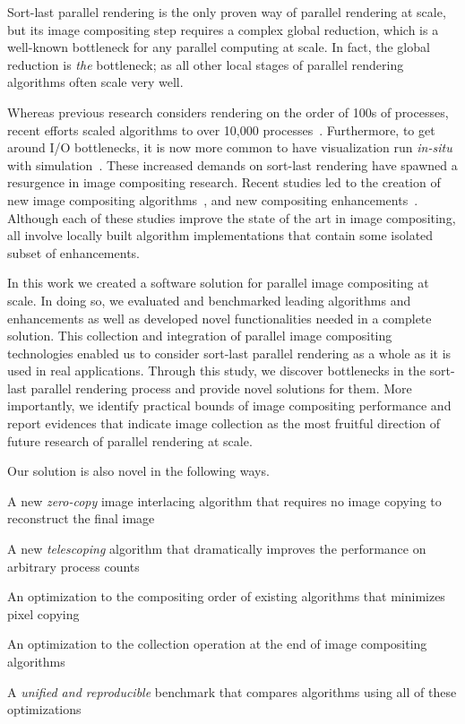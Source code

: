 \documentclass{sig-alternate}
\newcommand*{\lcite}[1]{~\cite{#1}}
\newenvironment{packed_itemize}{
\begin{itemize}
  \setlength{\topsep}{0pt}
  \setlength{\itemsep}{0pt}
  \setlength{\parskip}{0pt}
  \setlength{\parsep}{0pt}
  \setlength{\partopsep}{0pt}
}{\end{itemize}}
\begin{document}
Sort-last parallel rendering is the only proven way of parallel rendering
at scale, but its image compositing step requires a complex global reduction, 
which is a well-known bottleneck for any parallel computing at scale.
In fact, the global reduction is \textit{the} bottleneck; as all other local 
stages of parallel rendering algorithms often scale very well.

Whereas previous research considers rendering on the
order of 100s of processes, recent efforts scaled algorithms to over 10,000
processes\lcite{Peterka2009, Childs2010}.  
Furthermore, to get around I/O bottlenecks, it is now more common to have
visualization run \emph{in-situ} with
simulation\lcite{Ma2009:SciDACReview,Ma2009:CG&A,Yu2010,Tu2006}.
These increased demands on sort-last rendering have spawned a resurgence 
in image compositing research.  
Recent studies led to the creation of new image compositing 
algorithms\lcite{23Swap,RadixK}, and new compositing
enhancements\lcite{Kendall2010}.  Although each of these studies improve
the state of the art in image compositing, all involve locally built
algorithm implementations that contain some isolated subset of
enhancements.  

In this work we created a software solution for parallel image compositing 
at scale. In doing so, we evaluated and benchmarked leading algorithms and
enhancements as well as developed novel functionalities needed in
a complete solution.
This collection and
integration of parallel image compositing technologies enabled us to
consider sort-last parallel rendering as a whole as it is used in real
applications. Through this study, we discover bottlenecks in the
sort-last parallel rendering process and provide novel solutions for them.
More importantly, we identify practical bounds of image compositing
performance and report evidences that indicate image collection as 
the most fruitful direction of future research of parallel rendering
at scale.

Our solution is also novel in the following ways.
\begin{packed_itemize}
\item A new \textit{zero-copy} image interlacing algorithm that requires 
no image copying to reconstruct the final image
\item A new \textit{telescoping} algorithm that dramatically improves 
the performance on arbitrary process counts
\item An optimization to the compositing order of existing algorithms 
that minimizes pixel copying
\item An optimization to the collection operation at the end of image 
compositing algorithms
\item A \textit{unified and reproducible} benchmark that compares 
algorithms using all of these optimizations
\end{packed_itemize}
\end{document}
